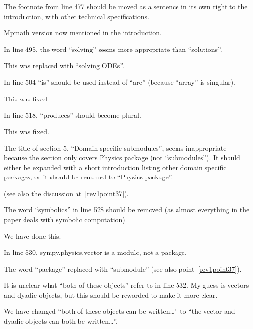 \documentclass[answers,12pt]{exam}
\begin{document}
\begin{questions}
\question The footnote from line 477 should be moved as a sentence in its own right to the introduction, with other technical specifications.
\begin{solution}
Mpmath version now mentioned in the introduction.
\end{solution}

\question In line 495, the word ``solving'' seems more appropriate than ``solutions''.
\begin{solution}
This was replaced with ``solving ODEs''.
\end{solution}

\question In line 504 ``is'' should be used instead of ``are'' (because ``array'' is singular).
\begin{solution}
This was fixed.
\end{solution}

\question In line 518, ``produces'' should become plural.
\begin{solution}
This was fixed.
\end{solution}

\question The title of section 5, ``Domain specific submodules'', seems inappropriate because the section only covers Physics package (not ``submodules''). It should either be expanded with a short introduction listing other domain specific packages, or it should be renamed to ``Physics package''.
\begin{solution}
(see also the discussion at~\ref{rev1point37}).
\end{solution}

\question The word ``symbolics'' in line 528 should be removed (as almost everything in the paper deals with symbolic computation).
\begin{solution}
We have done this.
\end{solution}

\question In line 530, sympy.physics.vector is a module, not a package.
\begin{solution}
The word ``package'' replaced with ``submodule'' (see also point~\ref{rev1point37}).
\end{solution}

\question It is unclear what ``both of these objects'' refer to in line 532. My guess is vectors and dyadic objects, but this should be reworded to make it more clear.
\begin{solution}
We have changed ``both of these objects can be written\ldots'' to ``the vector
and dyadic objects can both be written\ldots''.
\end{solution}


\end{questions}
\end{document}
